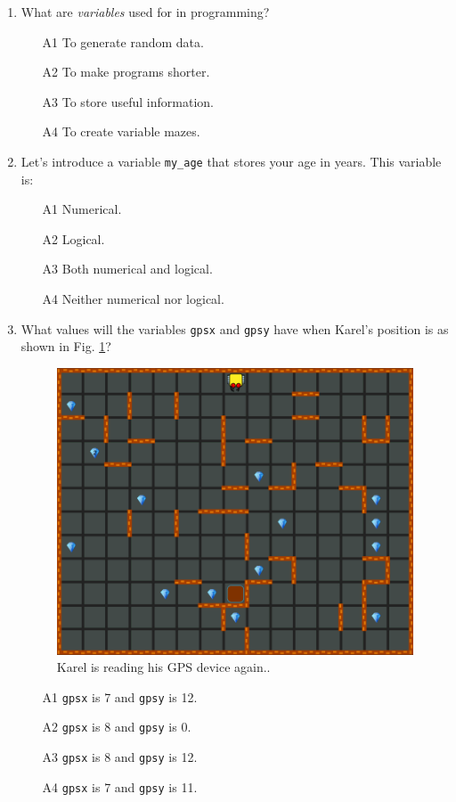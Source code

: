 \documentclass[article,A4,12pt]{llncs}
\begin{document}
{{{{\begin{enumerate}
\item What are {\em variables} used for in programming? 
\begin{enumerate}
\item[A1] To generate random data.
\item[A2] To make programs shorter.
\item[A3] To store useful information.
\item[A4] To create variable mazes.
\end{enumerate}
\item Let's introduce a variable {\tt my\_age} that stores your age in years.
      This variable is:
\begin{enumerate}
\item[A1] Numerical.
\item[A2] Logical.
\item[A3] Both numerical and logical.
\item[A4] Neither numerical nor logical.
\end{enumerate}
\item What values will the variables {\tt gpsx} and {\tt gpsy} have when Karel's
position is as shown in Fig. \ref{fig:var2}?
\begin{figure}[!ht]
\begin{center}
\includegraphics[height=0.4\textwidth]{img/variables2.png}
\end{center}
\vspace{-4mm}
\caption{Karel is reading his GPS device again..}
\label{fig:var2}
\end{figure}
\noindent

\begin{enumerate}
\item[A1] {\tt gpsx} is 7 and {\tt gpsy} is 12.
\item[A2] {\tt gpsx} is 8 and {\tt gpsy} is 0.
\item[A3] {\tt gpsx} is 8 and {\tt gpsy} is 12.
\item[A4] {\tt gpsx} is 7 and {\tt gpsy} is 11.
\end{enumerate}
\end{enumerate}

}}}}
\end{document}
